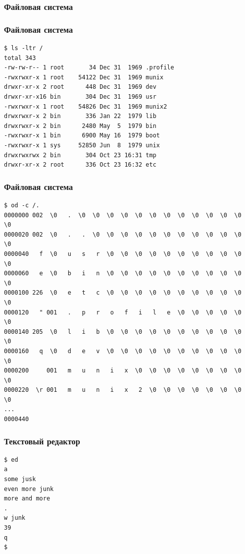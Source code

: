 \documentclass[t,aspectratio=169]{beamer}
\begin{document}
\begin{frame}[fragile]
    \frametitle{Файловая система}
\end{frame}

\begin{frame}[fragile]
    \frametitle{Файловая система}
    \begin{verbatim}
$ ls -ltr /
total 343
-rw-rw-r-- 1 root       34 Dec 31  1969 .profile
-rwxrwxr-x 1 root    54122 Dec 31  1969 munix
drwxr-xr-x 2 root      448 Dec 31  1969 dev
drwxr-xr-x16 bin       304 Dec 31  1969 usr
-rwxrwxr-x 1 root    54826 Dec 31  1969 munix2
drwxrwxr-x 2 bin       336 Jan 22  1979 lib
drwxrwxr-x 2 bin      2480 May  5  1979 bin
-rwxrwxr-x 1 bin      6900 May 16  1979 boot
-rwxrwxr-x 1 sys     52850 Jun  8  1979 unix
drwxrwxrwx 2 bin       304 Oct 23 16:31 tmp
drwxr-xr-x 2 root      336 Oct 23 16:32 etc
\end{verbatim}
\end{frame}

\begin{frame}[fragile]
    \frametitle{Файловая система}
    \begin{verbatim}
$ od -c /.
0000000 002  \0   .  \0  \0  \0  \0  \0  \0  \0  \0  \0  \0  \0  \0  \0
0000020 002  \0   .   .  \0  \0  \0  \0  \0  \0  \0  \0  \0  \0  \0  \0
0000040   f  \0   u   s   r  \0  \0  \0  \0  \0  \0  \0  \0  \0  \0  \0
0000060   e  \0   b   i   n  \0  \0  \0  \0  \0  \0  \0  \0  \0  \0  \0
0000100 226  \0   e   t   c  \0  \0  \0  \0  \0  \0  \0  \0  \0  \0  \0
0000120   " 001   .   p   r   o   f   i   l   e  \0  \0  \0  \0  \0  \0
0000140 205  \0   l   i   b  \0  \0  \0  \0  \0  \0  \0  \0  \0  \0  \0
0000160   q  \0   d   e   v  \0  \0  \0  \0  \0  \0  \0  \0  \0  \0  \0
0000200     001   m   u   n   i   x  \0  \0  \0  \0  \0  \0  \0  \0  \0
0000220  \r 001   m   u   n   i   x   2  \0  \0  \0  \0  \0  \0  \0  \0
...
0000440
\end{verbatim}
\end{frame}

\begin{frame}[fragile]
    \frametitle{Текстовый редактор}
    \begin{verbatim}
$ ed
a
some jusk
even more junk
more and more
.
w junk
39
q
$
\end{verbatim}
\end{frame}
\end{document}
